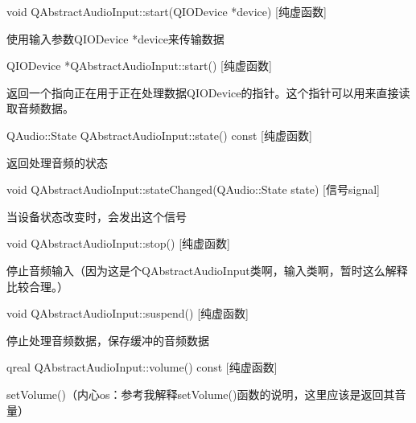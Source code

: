 void QAbstractAudioInput::start(QIODevice *device) [纯虚函数]

使用输入参数QIODevice *device来传输数据

QIODevice *QAbstractAudioInput::start() [纯虚函数]

返回一个指向正在用于正在处理数据QIODevice的指针。这个指针可以用来直接读取音频数据。

QAudio::State QAbstractAudioInput::state() const [纯虚函数]

返回处理音频的状态

void QAbstractAudioInput::stateChanged(QAudio::State state) [信号signal]

当设备状态改变时，会发出这个信号

void QAbstractAudioInput::stop() [纯虚函数]

停止音频输入（因为这是个QAbstractAudioInput类啊，输入类啊，暂时这么解释比较合理。）

void QAbstractAudioInput::suspend() [纯虚函数]

停止处理音频数据，保存缓冲的音频数据

qreal QAbstractAudioInput::volume() const [纯虚函数]


\begin{notice}[另请参阅]
setVolume()（内心os：参考我解释setVolume()函数的说明，这里应该是返回其音量）
\end{notice}

